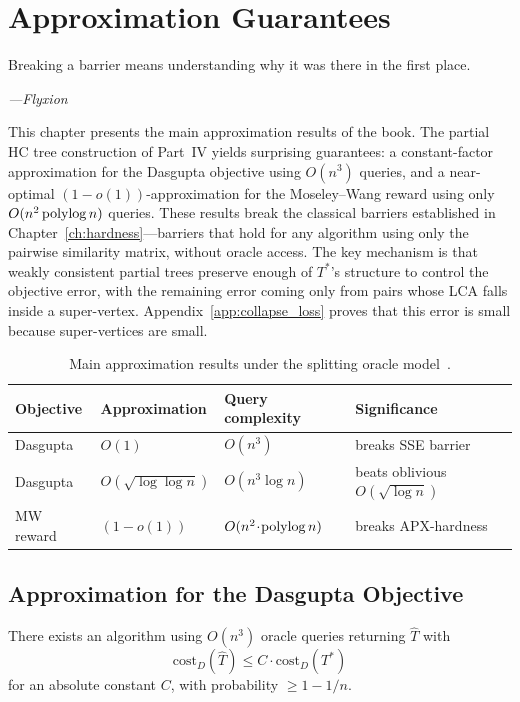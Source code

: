 \chapter{Approximation Guarantees}
\label{ch:approx}

\epigraph{%
  Breaking a barrier means understanding why it was there in the first place.%
}{\textit{---Flyxion}}

This chapter presents the main approximation results of the book. The partial HC tree construction of Part~IV yields surprising guarantees: a constant-factor approximation for the Dasgupta objective using $O(n^3)$ queries, and a near-optimal $(1-o(1))$-approximation for the Moseley--Wang reward using only $O(n^2 \operatorname{polylog} n)$ queries. These results break the classical barriers established in Chapter~\ref{ch:hardness}---barriers that hold for any algorithm using only the pairwise similarity matrix, without oracle access. The key mechanism is that weakly consistent partial trees preserve enough of $T^*$'s structure to control the objective error, with the remaining error coming only from pairs whose LCA falls inside a super-vertex. Appendix~\ref{app:collapse_loss} proves that this error is small because super-vertices are small.

\begin{table}[h]
\centering
\begin{tabular}{llll}
\toprule
Objective & Approximation & Query complexity & Significance \\
\midrule
Dasgupta  & $O(1)$           & $O(n^3)$               & breaks SSE barrier \\
Dasgupta  & $O(\sqrt{\log\log n})$ & $O(n^3\log n)$   & beats oblivious $O(\sqrt{\log n})$ \\
MW reward & $(1-o(1))$       & $O(n^2\!\cdot\!\operatorname{polylog} n)$ & breaks APX-hardness \\
\bottomrule
\end{tabular}
\caption{Main approximation results under the splitting oracle model~\cite{Dasgupta2016,MoseleyWang2017}.}
\label{tab:approx_results}
\end{table}

\section{Approximation for the Dasgupta Objective}

\begin{theorem}
\label{thm:dasgupta_const}
There exists an algorithm using $O(n^3)$ oracle queries returning $\widehat{T}$ with
\[
\mathrm{cost}_D(\widehat{T}) \leq C \cdot \mathrm{cost}_D(T^*)
\]
for an absolute constant $C$, with probability $\geq 1 - 1/n$.
\end{theorem}

